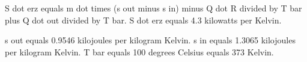 S dot erz equals m dot times (s out minus s in) minus Q dot R divided by T bar plus Q dot out divided by T bar.  
S dot erz equals 4.3 kilowatts per Kelvin.  

s out equals 0.9546 kilojoules per kilogram Kelvin.  
s in equals 1.3065 kilojoules per kilogram Kelvin.  
T bar equals 100 degrees Celsius equals 373 Kelvin.